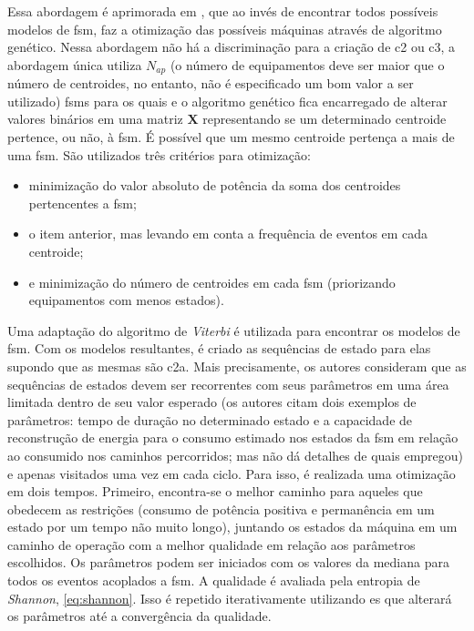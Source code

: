 \begin{enumerate}[label=\textbf{1.\arabic*},wide=\parindent]
\begin{enumerate}[label*=.\textbf{\arabic*},wide=\parindent]
\begin{itemize}[wide=\parindent]
Essa abordagem é aprimorada em
\cite{nilm_baranski_genetic_detalhado_2004_20,nilm_baranski_summary_2004_21},
que ao invés de encontrar todos possíveis modelos de \gls{fsm},
faz a otimização das possíveis máquinas através de algoritmo genético.
Nessa abordagem não há a discriminação para a criação de \gls{c2} ou
\gls{c3}, a abordagem única utiliza $N_{ap}$ (o número de equipamentos
deve ser maior que o número de centroides, no entanto, não é
especificado um bom valor a ser utilizado) \glspl{fsm} para os quais e o
algoritmo genético fica encarregado de alterar valores binários em uma
matriz $\mathbf{X}$ representando se um determinado centroide
pertence, ou não, à \gls{fsm}. É possível que um mesmo centroide
pertença a mais de uma \gls{fsm}. São utilizados três critérios para
otimização:

\begin{itemize}
\item minimização do valor absoluto de potência da soma dos
centroides pertencentes a \gls{fsm};
\item o item anterior, mas levando em conta a frequência de
eventos em cada centroide;
\item e minimização do número de centroides em
cada \gls{fsm} (priorizando equipamentos com menos estados).
\end{itemize}

Uma adaptação do algoritmo de \emph{Viterbi} é utilizada para encontrar os
modelos de \gls{fsm}. Com os modelos resultantes, é criado as
sequências de estado para elas supondo que as mesmas são \gls{c2a}.
Mais precisamente, os autores consideram que as sequências de estados
devem ser recorrentes com seus parâmetros em uma área limitada dentro
de seu valor esperado (os autores citam dois exemplos de parâmetros:
tempo de duração no determinado estado e a capacidade de reconstrução
de energia para o consumo estimado nos estados da \gls{fsm} em relação
ao consumido nos caminhos percorridos; mas não dá detalhes de quais
empregou) e apenas visitados uma vez em cada ciclo. Para isso, é
realizada uma otimização em dois tempos. Primeiro, encontra-se o
melhor caminho para aqueles que obedecem as restrições (consumo de
potência positiva e permanência em um estado por um tempo não muito
longo), juntando os estados da máquina em um caminho de operação com a
melhor qualidade em relação aos parâmetros escolhidos. Os parâmetros
podem ser iniciados com os valores da mediana para todos os eventos
acoplados a \gls{fsm}. A qualidade é avaliada pela entropia de
\emph{Shannon}, \ref{eq:shannon}. Isso é repetido iterativamente
utilizando \gls{es} que alterará os parâmetros até a convergência
da qualidade.


\end{itemize}
\end{enumerate}
\end{enumerate}
